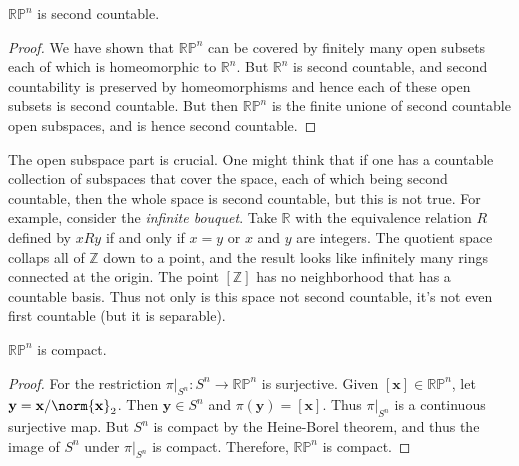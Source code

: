\documentclass{article}                                                        %
\begin{document}
        \begin{theorem}
            $\mathbb{RP}^{n}$ is second countable.
        \end{theorem}
        \begin{proof}
            We have shown that $\mathbb{RP}^{n}$ can be covered by finitely many
            open subsets each of which is homeomorphic to $\mathbb{R}^{n}$.
            But $\mathbb{R}^{n}$ is second countable, and second countability is
            preserved by homeomorphisms and hence each of these open subsets is
            second countable. But then $\mathbb{RP}^{n}$ is the finite unione of
            second countable open subspaces, and is hence second countable.
        \end{proof}
        The open subspace part is crucial. One might think that if one has a
        countable collection of subspaces that cover the space, each of which
        being second countable, then the whole space is second countable, but
        this is not true. For example, consider the \textit{infinite bouquet}.
        Take $\mathbb{R}$ with the equivalence relation $R$ defined by
        $xRy$ if and only if $x=y$ or $x$ and $y$ are integers. The quotient
        space collaps all of $\mathbb{Z}$ down to a point, and the result looks
        like infinitely many rings connected at the origin. The point
        $[\mathbb{Z}]$ has no neighborhood that has a countable basis. Thus not
        only is this space not second countable, it's not even first countable
        (but it is separable).
        \begin{theorem}
            $\mathbb{RP}^{n}$ is compact.
        \end{theorem}
        \begin{proof}
            For the restriction $\pi|_{S^{n}}:S^{n}\rightarrow\mathbb{RP}^{n}$
            is surjective. Given $[\mathbf{x}]\in\mathbb{RP}^{n}$, let
            $\mathbf{y}=\mathbf{x}/\norm{\mathbf{x}}_{2}$. Then
            $\mathbf{y}\in{S}^{n}$ and $\pi(\mathbf{y})=[\mathbf{x}]$. Thus
            $\pi|_{S^{n}}$ is a continuous surjective map. But $S^{n}$ is
            compact by the Heine-Borel theorem, and thus the image of
            $S^{n}$ under $\pi|_{S^{n}}$ is compact. Therefore,
            $\mathbb{RP}^{n}$ is compact.
        \end{proof}
\end{document}
